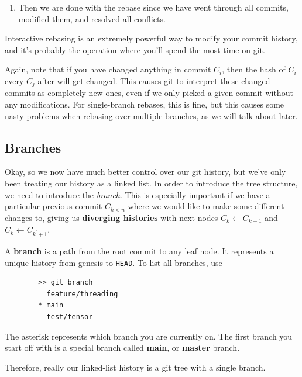 \documentclass{article}
\begin{document}
\begin{definition}[Rebasing]
\begin{enumerate}
        \item Then we are done with the rebase since we have went through all commits, modified them, and resolved all conflicts. 
      \end{enumerate}
      Interactive rebasing is an extremely powerful way to modify your commit history, and it's probably the operation where you'll spend the most time on git. 
    \end{definition} 

    Again, note that if you have changed anything in commit $C_i$, then the hash of $C_i$ every $C_j$ after will get changed. This causes git to interpret these changed commits as completely new ones, even if we only picked a given commit without any modifications. For single-branch rebases, this is fine, but this causes some nasty problems when rebasing over multiple branches, as we will talk about later. 

  \subsection{Branches} 

    Okay, so we now have much better control over our git history, but we've only been treating our history as a linked list. In order to introduce the tree structure, we need to introduce the \textit{branch}. This is especially important if we have a particular previous commit $C_{k < n}$ where we would like to make some different changes to, giving us \textbf{diverging histories} with next nodes $C_k \leftarrow C_{k+1}$ and $C_k \leftarrow C_{k^\prime + 1}$. 
    
    \begin{definition}[Branch]
      A \textbf{branch} is a path from the root commit to any leaf node. It represents a unique history from genesis to \texttt{HEAD}. To list all branches, use 
      \begin{lstlisting}
        >> git branch 
          feature/threading
        * main
          test/tensor
      \end{lstlisting} 
      The asterisk represents which branch you are currently on. The first branch you start off with is a special branch called \textbf{main}, or \textbf{master} branch. 
    \end{definition} 

    Therefore, really our linked-list history is a git tree with a single branch. 
\end{document}
